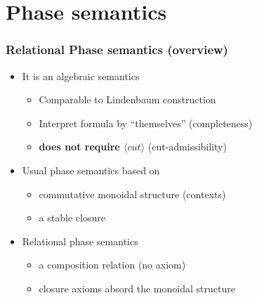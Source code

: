 \documentclass[xcolor=pdftex,graphicx=pdftex,12pt]{beamer}
\renewcommand\frule[1]{\ensuremath{\langle#1\rangle}}
\newcommand{\seq}{\mathrel\vdash}
\newcommand{\lbang}{\mathop{!}}
\newcommand{\cperm}{\mathrel{\sim_p}}
\begin{document}

\section{Phase semantics}

\begin{frame}

\frametitle{Relational Phase semantics (overview)}

\begin{itemize}
\item It is an algebraic semantics
  \begin{itemize}
  \item Comparable to Lindenbaum construction
  \item Interpret formula by ``themselves'' (completeness)
  \item {\bf does not require \frule{cut}} (cut-admissibility)
  \end{itemize}
\item Usual phase semantics based on
  \begin{itemize}
  \item commutative monoidal structure (contexts)
  \item a stable closure
  \end{itemize}
\item Relational phase semantics
  \begin{itemize}
  \item a composition relation (no axiom)
  \item closure axioms absord the monoidal structure
  \end{itemize}
\end{itemize}

\end{frame}
\end{document}
